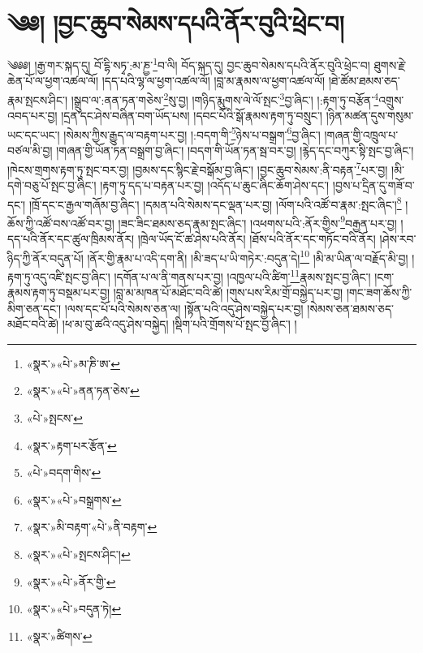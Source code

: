 \chapter{༄༅། །བྱང་ཆུབ་སེམས་དཔའི་ནོར་བུའི་ཕྲེང་བ།}༄༅༅། །རྒྱ་གར་སྐད་དུ། བོ་དྷི་སཏྭ་:མ་ཎྱ་\footnote{«སྣར་»«པེ་»མ་ཎི་ཨ་}བ་ལི། བོད་སྐད་དུ། བྱང་ཆུབ་སེམས་དཔའི་ནོར་བུའི་ཕྲེང་བ། ཐུགས་རྗེ་ཆེན་པོ་ལ་ཕྱག་འཚལ་ལོ། །དད་པའི་ལྷ་ལ་ཕྱག་འཚལ་ལོ། །བླ་མ་རྣམས་ལ་ཕྱག་འཚལ་ལོ། །ཐེ་ཚོམ་ཐམས་ཅད་རྣམ་སྤངས་ཤིང་། །སྒྲུབ་ལ་:ནན་ཏན་གཅེས་\footnote{«སྣར་»«པེ་»ནན་ཏན་ཅེས་}སུ་བྱ། །གཉིད་རྨུགས་ལེ་ལོ་སྤང་\footnote{«པེ་»སྤངས་}བྱ་ཞིང་། །:རྟག་ཏུ་བརྩོན་\footnote{«སྣར་»རྟག་པར་རྩོན་}འགྲུས་འབད་པར་བྱ། །དྲན་དང་ཤེས་བཞིན་བག་ཡོད་པས། །དབང་པོའི་སྒོ་རྣམས་རྟག་ཏུ་བསྲུང་། །ཉིན་མཚན་དུས་གསུམ་ཡང་དང་ཡང་། །སེམས་ཀྱིས་རྒྱུད་ལ་བརྟག་པར་བྱ། །:བདག་གི་\footnote{«པེ་»བདག་གིས་}ཉེས་པ་བསྒྲག་\footnote{«སྣར་»«པེ་»བསྒྲགས་}བྱ་ཞིང་། །གཞན་གྱི་འཁྲུལ་པ་བཙལ་མི་བྱ། །གཞན་གྱི་ཡོན་ཏན་བསྒྲག་བྱ་ཞིང་། །བདག་གི་ཡོན་ཏན་སྦ་བར་བྱ། །རྙེད་དང་བཀུར་སྟི་སྤང་བྱ་ཞིང་། །ཁེངས་གྲགས་རྟག་ཏུ་སྤང་བར་བྱ། །བྱམས་དང་སྙིང་རྗེ་བསྒོམ་བྱ་ཞིང་། །བྱང་ཆུབ་སེམས་:ནི་བརྟན་\footnote{«སྣར་»མི་བརྟག་«པེ་»ནི་བརྟག་}པར་བྱ། །མི་དགེ་བཅུ་པོ་སྤང་བྱ་ཞིང་། །རྟག་ཏུ་དད་པ་བརྟན་པར་བྱ། །འདོད་པ་ཆུང་ཞིང་ཆོག་ཤེས་དང་། །བྱས་པ་དྲིན་དུ་གཟོ་བ་དང་། །ཁྲོ་དང་ང་རྒྱལ་གཞོམ་བྱ་ཞིང་། །དམན་པའི་སེམས་དང་ལྡན་པར་བྱ། །ལོག་པའི་འཚོ་བ་རྣམ་:སྤང་ཞིང་།\footnote{«སྣར་»«པེ་»སྤངས་ཤིང་།} །ཆོས་ཀྱི་འཚོ་བས་འཚོ་བར་བྱ། །ཟང་ཟིང་ཐམས་ཅད་རྣམ་སྤང་ཞིང་། །འཕགས་པའི་:ནོར་གྱིས་\footnote{«སྣར་»«པེ་»ནོར་གྱི་}བརྒྱན་པར་བྱ། །དད་པའི་ནོར་དང་ཚུལ་ཁྲིམས་ནོར། །ཁྲེལ་ཡོད་ངོ་ཚ་ཤེས་པའི་ནོར། །ཐོས་པའི་ནོར་དང་གཏོང་བའི་ནོར། །ཤེས་རབ་ཉིད་ཀྱི་ནོར་བདུན་པོ། །ནོར་གྱི་རྣམ་པ་འདི་དག་ནི། །མི་ཟད་པ་ཡི་གཏེར་:བདུན་དེ།\footnote{«སྣར་»«པེ་»བདུན་ཏེ།} །མི་མ་ཡིན་ལ་བརྗོད་མི་བྱ། །རྟག་ཏུ་འདུ་འཛི་སྤང་བྱ་ཞིང་། །དགོན་པ་ལ་ནི་གནས་པར་བྱ། །འཁྱལ་པའི་ཚིག་\footnote{«སྣར་»ཚིགས་}རྣམས་སྤང་བྱ་ཞིང་། །ངག་རྣམས་རྟག་ཏུ་བསྡམ་པར་བྱ། །བླ་མ་མཁན་པོ་མཐོང་བའི་ཚེ། །གུས་པས་རིམ་གྲོ་བསྐྱེད་པར་བྱ། །གང་ཟག་ཆོས་ཀྱི་མིག་ཅན་དང་། །ལས་དང་པོ་པའི་སེམས་ཅན་ལ། །སྟོན་པའི་འདུ་ཤེས་བསྐྱེད་པར་བྱ། །སེམས་ཅན་ཐམས་ཅད་མཐོང་བའི་ཚེ། །ཕ་མ་བུ་ཚའི་འདུ་ཤེས་བསྐྱེད། །སྡིག་པའི་གྲོགས་པོ་སྤང་བྱ་ཞིང་། །
